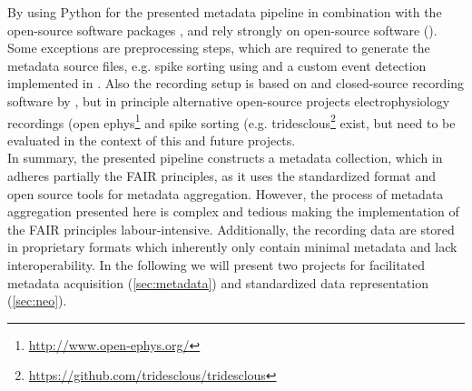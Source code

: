 By using Python for the presented metadata pipeline in combination with the open-source software packages ,  and  \citet{Brochier_2018} rely strongly on open-source software (). Some exceptions are preprocessing steps, which are required to generate the metadata source files, e.g. spike sorting using  and a custom event detection implemented in . Also the recording setup is based on  and closed-source recording software by , but in principle alternative open-source projects electrophysiology recordings (open ephys\footnote{\url{http://www.open-ephys.org/}} and spike sorting (e.g. tridesclous\footnote{\url{https://github.com/tridesclous/tridesclous}} exist, but need to be evaluated in the context of this and future projects.\\

In summary, the presented pipeline constructs a metadata collection, which in adheres partially the FAIR principles, as it uses the standardized  format and open source tools for metadata aggregation. However, the process of metadata aggregation presented here is complex and tedious making the implementation of the FAIR principles labour-intensive. Additionally, the recording data are stored in proprietary formats which inherently only contain minimal metadata and lack interoperability. In the following we will present two projects for facilitated metadata acquisition (\ref{sec:metadata}) and standardized data representation (\ref{sec:neo}).



